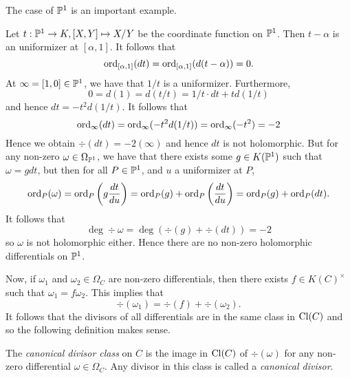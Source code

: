 The case of $\mathbb{P}^1$ is an important example.
\begin{example}
	\label{ex:proj-holomorphic}
	Let $t:\mathbb{P}^1 \to K, [X, Y]\mapsto X/Y$ be the coordinate function on
	$\mathbb{P}^1$. Then $t - \alpha$ is an uniformizer at $[\alpha, 1]$.
	It follows that
	\begin{equation*}
		\operatorname{ord}_{[\alpha, 1]}(dt) = \operatorname{ord}_{[\alpha, 1]}(d(t - \alpha)) = 0.
	\end{equation*}
	At $\infty = [1, 0]\in \mathbb{P}^1$, we have that $1/t$ is a uniformizer.
	Furthermore,
	\begin{equation*}
		0 = d(1) = d(t/t) = 1/t\cdot dt + td(1/t)
	\end{equation*}
	and hence $dt = -t^2d(1/t)$. It follows that 
	\begin{equation*}
		\operatorname{ord}_{\infty}(dt) = \operatorname{ord}_{\infty}(-t^2d(1/t)) = 
		\operatorname{ord}_{\infty}(-t^2) = -2
	\end{equation*}
	Hence we obtain $\div(dt) = -2(\infty)$ and hence $dt$ is not holomorphic.
	But for any non-zero $\omega \in \Omega_{\mathbb{P}^1}$, 
	we have that there exists some $g \in K(\mathbb{P}^1)$ such that 
	$\omega = gdt$, but then for all $P \in \mathbb{P}^1$, and $u$ a uniformizer
	at $P$,
	\begin{equation*}
		\operatorname{ord}_P(\omega) = \operatorname{ord}_P\left(g\frac{dt}{du}\right) = \operatorname{ord}_P(g)
		+ \operatorname{ord}_P\left(\frac{dt}{du}\right) = \operatorname{ord}_P(g) + \operatorname{ord}_P(dt).
	\end{equation*}
	It follows that 
	\begin{equation*}
		\deg\div \omega = \deg(\div(g) + \div(dt)) = -2
	\end{equation*}
	so $\omega$ is not holomorphic either.
	Hence there are no non-zero holomorphic differentials on $\mathbb{P}^1$.
\end{example}

Now, if $\omega_1$ and $\omega_2 \in \Omega_C$ are non-zero differentials, then
there exists $f\in K(C)^\times$ such that $\omega_1 = f\omega_2$.
This implies that
\begin{equation*}
	\div(\omega_1) = \div(f) + \div(\omega_2).
\end{equation*}
It follows that the divisors of all differentials are in the same class in
$\operatorname{Cl}(C)$ and so the following definition makes sense.

\begin{definition}
	The \emph{canonical divisor class} on $C$ is the image in $\operatorname{Cl}(C)$ of
	$\div(\omega)$ for any non-zero differential $\omega \in \Omega_C$.
	Any divisor in this class is called a \emph{canonical divisor}.
\end{definition}

